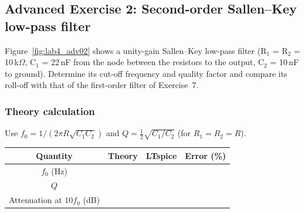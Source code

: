 \subsection{Advanced Exercise 2: Second-order Sallen--Key low-pass filter}
Figure~\ref{fig:lab4_adv02} shows a unity-gain Sallen--Key low-pass filter (R$_1$ = R$_2$ = 10\,k$\Omega$, C$_1$ = 22\,nF from the node between the resistors to the output, C$_2$ = 10\,nF to ground). Determine its cut-off frequency and quality factor and compare its roll-off with that of the first-order filter of Exercise~7.


\subsubsection{Theory calculation}\vspace{-3pt}\notesblock Use $f_0=1/(2\pi R\sqrt{C_1C_2})$ and $Q=\tfrac12\sqrt{C_1/C_2}$ (for $R_1=R_2=R$).

\begin{center}\renewcommand{\arraystretch}{1.8}\begin{tabular}{|c|c|c|c|}\hline \textbf{Quantity} & \textbf{Theory} & \textbf{LTspice} & \textbf{Error (\%)}\\ \hline $f_0$ (Hz) & & & \\ \hline $Q$ & & & \\ \hline Attenuation at $10f_0$ (dB) & & & \\ \hline \end{tabular}\end{center}
\newpage
